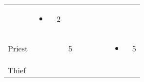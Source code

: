 \documentclass[12pt]{article}
\begin{document}
\begin{longtable}[]{@{}llllllllll@{}}
\begin{minipage}[t]{0.06\columnwidth}\raggedright\strut
\strut\end{minipage} &
\begin{minipage}[t]{0.07\columnwidth}\raggedright\strut
\begin{itemize}
\item
\end{itemize}
\strut\end{minipage} &
\begin{minipage}[t]{0.08\columnwidth}\raggedright\strut
2
\strut\end{minipage}\tabularnewline
\begin{minipage}[t]{0.13\columnwidth}\raggedright\strut
Priest
\strut\end{minipage} &
\begin{minipage}[t]{0.06\columnwidth}\raggedright\strut
\strut\end{minipage} &
\begin{minipage}[t]{0.06\columnwidth}\raggedright\strut
\strut\end{minipage} &
\begin{minipage}[t]{0.06\columnwidth}\raggedright\strut
5
\strut\end{minipage} &
\begin{minipage}[t]{0.06\columnwidth}\raggedright\strut
\strut\end{minipage} &
\begin{minipage}[t]{0.06\columnwidth}\raggedright\strut
\strut\end{minipage} &
\begin{minipage}[t]{0.06\columnwidth}\raggedright\strut
\strut\end{minipage} &
\begin{minipage}[t]{0.06\columnwidth}\raggedright\strut
\strut\end{minipage} &
\begin{minipage}[t]{0.07\columnwidth}\raggedright\strut
\begin{itemize}
\item
\end{itemize}
\strut\end{minipage} &
\begin{minipage}[t]{0.08\columnwidth}\raggedright\strut
5
\strut\end{minipage}\tabularnewline
\begin{minipage}[t]{0.13\columnwidth}\raggedright\strut
Thief
\strut\end{minipage} &
\begin{minipage}[t]{0.06\columnwidth}\raggedright\strut

\end{minipage}
\end{longtable}
\end{document}
